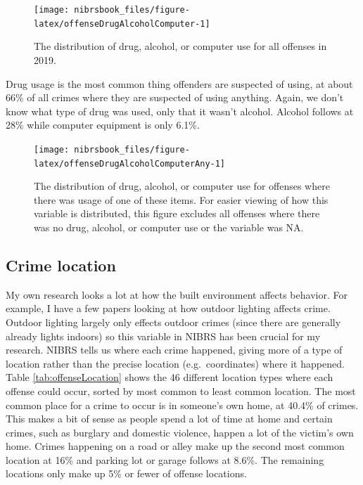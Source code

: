 \documentclass[
  12pt,
  openany]{book}
\begin{document}
\begin{figure}

{\centering \texttt{[image: nibrsbook\_files/figure-latex/offenseDrugAlcoholComputer-1]} 

}

\caption{The distribution of drug, alcohol, or computer use for all offenses in 2019.}\label{fig:offenseDrugAlcoholComputer}
\end{figure}

Drug usage is the most common thing offenders are suspected of using, at about 66\% of all crimes where they are suspected of using anything. Again, we don't know what type of drug was used, only that it wasn't alcohol. Alcohol follows at 28\% while computer equipment is only 6.1\%.

\begin{figure}

{\centering \texttt{[image: nibrsbook\_files/figure-latex/offenseDrugAlcoholComputerAny-1]} 

}

\caption{The distribution of drug, alcohol, or computer use for offenses where there was usage of one of these items. For easier viewing of how this variable is distributed, this figure excludes all offenses where there was no drug, alcohol, or computer use or the variable was NA.}\label{fig:offenseDrugAlcoholComputerAny}
\end{figure}

\hypertarget{crime-location}{%
\subsection{Crime location}\label{crime-location}}

My own research looks a lot at how the built environment affects behavior. For example, I have a few papers looking at how outdoor lighting affects crime. Outdoor lighting largely only effects outdoor crimes (since there are generally already lights indoors) so this variable in NIBRS has been crucial for my research. NIBRS tells us where each crime happened, giving more of a type of location rather than the precise location (e.g.~coordinates) where it happened. Table \ref{tab:offenseLocation} shows the 46 different location types where each offense could occur, sorted by most common to least common location. The most common place for a crime to occur is in someone's own home, at 40.4\% of crimes. This makes a bit of sense as people spend a lot of time at home and certain crimes, such as burglary and domestic violence, happen a lot of the victim's own home. Crimes happening on a road or alley make up the second most common location at 16\% and parking lot or garage follows at 8.6\%. The remaining locations only make up 5\% or fewer of offense locations.
\end{document}
